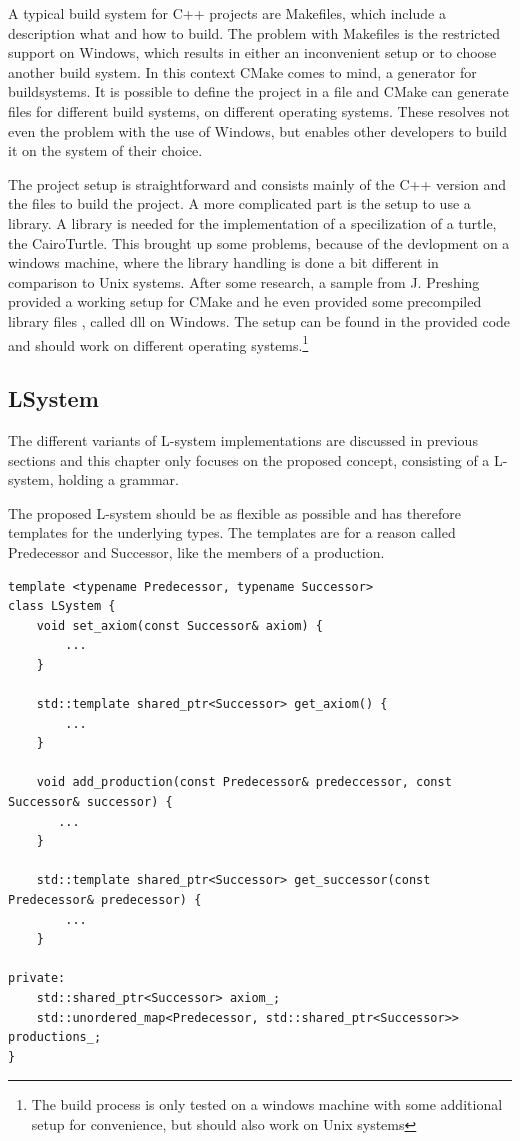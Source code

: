 \documentclass[english]{cpp-hmwk}
\begin{document}
A typical build system for C++ projects are Makefiles, which include a description what and how to build. The problem with Makefiles is the restricted support on Windows, which results in either an inconvenient setup or to choose another build system.
In this context CMake comes to mind, a generator for buildsystems. It is possible to define the project in a file and CMake can generate files for different build systems, on different operating systems. These resolves not even the problem with the use of Windows, but enables other developers to build it on the system of their choice.

The project setup is straightforward and consists mainly of the C++ version and the files to build the project. A more complicated part is the setup to use a library. A library is needed for the implementation of a specilization of a turtle, the CairoTurtle. This brought up some problems, because of the devlopment on a windows machine, where the library handling is done a bit different in comparison to Unix systems. After some research, a sample from J. Preshing \cite{cairoinclude} provided a working setup for CMake and he even provided some precompiled library files \cite{cairodll}, called dll on Windows. 
The setup can be found in the provided code and should work on different operating systems.\footnote{The build process is only tested on a windows machine with some additional setup for convenience, but should also work on Unix systems}

\subsection{LSystem}
\label{section:impl_l_system}
The different variants of L-system implementations are discussed in previous sections and this chapter only focuses on the proposed concept, consisting of a L-system, holding a grammar.

The proposed L-system should be as flexible as possible and has therefore templates for the underlying types. The templates are for a reason called Predecessor and Successor, like the members of a production.

\medskip
\begin{lstlisting}
template <typename Predecessor, typename Successor>
class LSystem {
    void set_axiom(const Successor& axiom) {
        ...
    }

    std::template shared_ptr<Successor> get_axiom() {
        ...
    }

    void add_production(const Predecessor& predeccessor, const Successor& successor) {
       ...
    }

    std::template shared_ptr<Successor> get_successor(const Predecessor& predecessor) {
        ...
    }
    
private:
    std::shared_ptr<Successor> axiom_;
    std::unordered_map<Predecessor, std::shared_ptr<Successor>> productions_;
}
\end{lstlisting}
\end{document}
